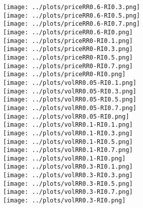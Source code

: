 \documentclass[a4paper, 11pt]{report}
\begin{document}
\texttt{[image: ../plots/priceRR0.6-RI0.3.png]}\\
\texttt{[image: ../plots/priceRR0.6-RI0.5.png]}\\
\texttt{[image: ../plots/priceRR0.6-RI0.7.png]}\\
\texttt{[image: ../plots/priceRR0.6-RI0.png]}\\
\texttt{[image: ../plots/priceRR0-RI0.1.png]}\\
\texttt{[image: ../plots/priceRR0-RI0.3.png]}\\
\texttt{[image: ../plots/priceRR0-RI0.5.png]}\\
\texttt{[image: ../plots/priceRR0-RI0.7.png]}\\
\texttt{[image: ../plots/priceRR0-RI0.png]}\\
\texttt{[image: ../plots/volRR0.05-RI0.1.png]}\\
\texttt{[image: ../plots/volRR0.05-RI0.3.png]}\\
\texttt{[image: ../plots/volRR0.05-RI0.5.png]}\\
\texttt{[image: ../plots/volRR0.05-RI0.7.png]}\\
\texttt{[image: ../plots/volRR0.05-RI0.png]}\\
\texttt{[image: ../plots/volRR0.1-RI0.1.png]}\\
\texttt{[image: ../plots/volRR0.1-RI0.3.png]}\\
\texttt{[image: ../plots/volRR0.1-RI0.5.png]}\\
\texttt{[image: ../plots/volRR0.1-RI0.7.png]}\\
\texttt{[image: ../plots/volRR0.1-RI0.png]}\\
\texttt{[image: ../plots/volRR0.3-RI0.1.png]}\\
\texttt{[image: ../plots/volRR0.3-RI0.3.png]}\\
\texttt{[image: ../plots/volRR0.3-RI0.5.png]}\\
\texttt{[image: ../plots/volRR0.3-RI0.7.png]}\\
\texttt{[image: ../plots/volRR0.3-RI0.png]}\\
\end{document}

